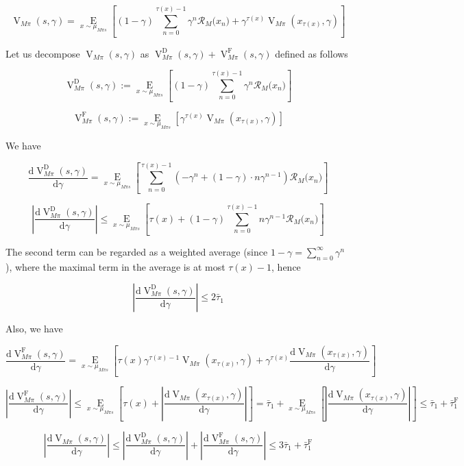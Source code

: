 \documentclass[a4paper]{article}
\newcommand{\Comment}[1]{}
\newcommand{\AP}[1]{\left(#1\right)}
\newcommand{\AB}[1]{\left[#1\right]}
\newcommand{\Ea}[2]{\underset{#1}{\operatorname{E}}\AB{#2}}
\newcommand{\D}{\mathrm{d}}
\newcommand{\Abs}[1]{\left\vert #1 \right\vert}
\newcommand{\R}{\mathcal{R}}
\newcommand{\RMD}{\mathrm{D}}
\newcommand{\RMF}{\mathrm{F}}
\newcommand{\TF}{\bar{\tau}^{\RMF}}
\newcommand{\V}{\operatorname{V}}
\begin{document}
$$\V_{M\pi}(s,\gamma) = \Ea{x\sim\mu_{M\pi s}}{(1-\gamma)\sum_{n=0}^{\tau(x)-1} \gamma^n \R_M\Big(x_n\Big) + \gamma^{\tau(x)}\V_{M\pi}\AP{x_{\tau(x)},\gamma}}$$

Let us decompose $\V_{M\pi}(s,\gamma)$ as $\V_{M\pi}^\RMD(s,\gamma)+\V_{M\pi}^\RMF(s,\gamma)$ defined as follows

$$\V_{M\pi}^\RMD(s,\gamma) := \Ea{x\sim\mu_{M\pi s}}{(1-\gamma)\sum_{n=0}^{\tau(x)-1} \gamma^n \R_M\Big(x_n\Big) }$$

$$\V_{M\pi}^\RMF(s,\gamma) := \Ea{x\sim\mu_{M\pi s}}{\gamma^{\tau(x)}\V_{M\pi}\AP{x_{\tau(x)},\gamma}}$$

We have

$$\frac{\D\V_{M\pi}^\RMD(s,\gamma)}{\D\gamma} = \Ea{x\sim\mu_{M\pi s}}{\sum_{n=0}^{\tau(x)-1} \AP{-\gamma^n+(1-\gamma)\cdot n\gamma^{n-1}} \R_M\Big(x_n\Big)}$$

$$\Abs{\frac{\D\V_{M\pi}^\RMD(s,\gamma)}{\D\gamma}} \leq \Ea{x\sim\mu_{M\pi s}}{\tau(x)+(1-\gamma)\sum_{n=0}^{\tau(x)-1} n\gamma^{n-1} \R_M\Big(x_n\Big) }$$

The second term can be regarded as a weighted average (since $1-\gamma=\sum_{n=0}^\infty \gamma^n$), where the maximal term in the average is at most $\tau(x)-1$, hence

$$\Abs{\frac{\D\V_{M\pi}^\RMD(s,\gamma)}{\D\gamma}} \leq 2 \bar{\tau}_1$$

Also, we have

$$\frac{\D\V_{M\pi}^\RMF(s,\gamma)}{\D\gamma} = \Ea{x\sim\mu_{M\pi s}}{\tau(x)\gamma^{\tau(x)-1}\V_{M\pi}\AP{x_{\tau(x)},\gamma}+\gamma^{\tau(x)}\frac{\D\V_{M\pi}\AP{x_{\tau(x)},\gamma}}{\D\gamma}}$$

$$\Abs{\frac{\D\V_{M\pi}^\RMF(s,\gamma)}{\D\gamma}} \leq \Ea{x\sim\mu_{M\pi s}}{ \tau(x)+\Abs{\frac{\D\V_{M\pi}\AP{x_{\tau(x)},\gamma}}{\D\gamma}}} = \bar{\tau}_1 + \Ea{x\sim\mu_{M\pi s}}{\Abs{\frac{\D\V_{M\pi}\AP{x_{\tau(x)},\gamma}}{\D\gamma}}} \leq \bar{\tau}_1 + \TF_1$$

$$\Abs{\frac{\D\V_{M\pi}(s,\gamma)}{\D\gamma}} \leq \Abs{\frac{\D\V_{M\pi}^\RMD(s,\gamma)}{\D\gamma}}+\Abs{\frac{\D\V_{M\pi}^\RMF(s,\gamma)}{\D\gamma}} \leq 3 \bar{\tau}_1 + \bar{\tau}_1^\RMF$$

\Comment{$$\Abs{\frac{\D\V_{M\pi}^\RMF(s,\gamma)}{\D\gamma}\bigg\vert_{\gamma=1}} \leq \bar{\tau}_1 + \Ea{x\sim\mu_{M\pi s}}{\Abs{\V_{M\pi}^1\AP{x_{\tau(x)}}}} \leq \bar{\tau}_1 + \bar{\tau}_1^\RMF$$

We conclude

$$\Abs{\V_{M\pi}^1(s)} \leq \Abs{\frac{\D\V_{M\pi}^\RMD(s,\gamma)}{\D\gamma}\bigg\vert_{\gamma=1}}+\Abs{\frac{\D\V_{M\pi}^\RMF(s,\gamma)}{\D\gamma}\bigg\vert_{\gamma=1}} \leq 3 \bar{\tau}_1 + \bar{\tau}_1^\RMF$$}
\end{document}
